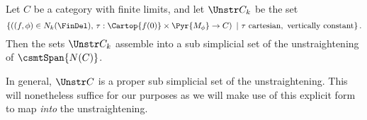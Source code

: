 \documentclass[a4paper]{article}
\numberwithin{equation}{section}
\begin{document}
\begin{prop}
\label{UnstrSimps}
Let $C$ be a category with finite limits, and let $\Unstr C_k$ be the set
\begin{equation*}
 \left\{ \left((f,\phi)\in N_k(\FinDel), \, \tau: \Cartop{f(0)}\times\Pyr{M_\phi} \to C\right) \ | \ \tau \ {\rm cartesian}, \ {\rm vertically} \  {\rm constant}\right\}.
\end{equation*}
Then the sets $\Unstr C_k$ assemble into a sub simplicial set of the unstraightening of $\csmtSpan {N(C)}$.
\end{prop}
\begin{remark}
 In general, $\Unstr C$ is a proper sub simplicial set of the unstraightening. This will nonetheless suffice for our purposes as we will make use of this explicit form to map {\em into} the unstraightening. 
\end{remark}
\end{document}
